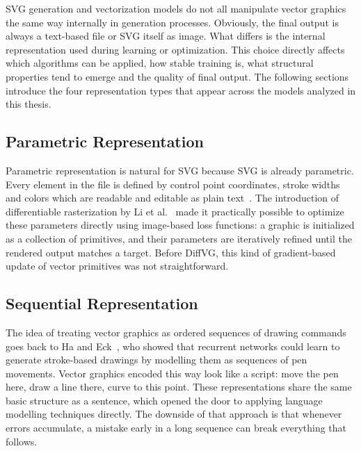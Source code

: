 SVG generation and vectorization models do not all manipulate 
vector graphics the same way internally in generation processes. Obviously, the final output is 
always a text-based file or SVG itself as image. What differs is the internal representation 
used during learning or optimization. This choice directly 
affects which algorithms can be applied, how stable training 
is, what structural properties tend to emerge and the quality of final output. 
The following sections introduce the four representation types 
that appear across the models analyzed in this thesis.

\subsection{Parametric Representation}
\label{sec:parametric_repr}

Parametric representation is natural for SVG because  
SVG is already parametric. Every element in the file is 
defined by control point coordinates, stroke 
widths and colors which are readable and editable as plain 
text~\cite{eisenbergSVGEssentialsProducing20}. The introduction 
of differentiable rasterization by Li et 
al.~\cite{liDifferentiableVectorGraphics2020a} made it practically possible 
to optimize these parameters directly using image-based loss 
functions: a graphic is initialized as a collection of 
primitives, and their parameters are iteratively refined until 
the rendered output matches a target. Before DiffVG, this kind 
of gradient-based update of vector primitives was not 
straightforward.

\subsection{Sequential Representation}
\label{sec:sequential_repr}

The idea of treating vector graphics as ordered sequences of 
drawing commands goes back to Ha and 
Eck~\cite{haNeuralRepresentationSketch2017}, who showed that 
recurrent networks could learn to generate stroke-based 
drawings by modelling them as sequences of pen movements. 
Vector graphics encoded this way look like a script: move the pen here,
draw a line there, curve to this point. These representations share the same basic 
structure as a sentence, which opened the door to applying 
language modelling techniques directly. The downside of that approach 
is that whenever errors accumulate, a mistake early in a long sequence can 
break everything that follows.

